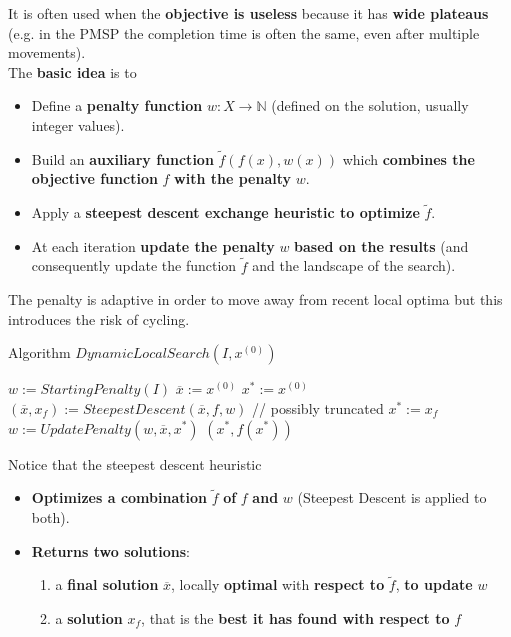 \documentclass[11pt]{article}
\begin{document}
	It is often used when the \textbf{objective is useless} because it has \textbf{wide plateaus} (e.g. in the PMSP the completion time is often the same, even after multiple movements).\\
	
	The \textbf{basic idea} is to
	\begin{itemize}
		\item Define a \textbf{penalty function} $w : X \rightarrow \mathbb{N}$ (defined on the solution, usually integer values).\\
		
		\item Build an \textbf{auxiliary function} $\tilde{f} (f (x) , w (x))$ which \textbf{combines the objective function} $f$ \textbf{with the penalty} $w$.\\
		
		\item Apply a \textbf{steepest descent exchange heuristic to optimize} $\tilde{f}$.\\
		
		\item At each iteration \textbf{update the penalty} $w$ \textbf{based on the results} (and consequently update the function $\tilde{f}$ and the landscape of the search).\\
	\end{itemize}
	
	The penalty is adaptive in order to move away from recent local optima but this introduces the risk of cycling.\\
	
	\newpage
	
	\begin{algorithm}
		\caption{Algorithm $DynamicLocalSearch(I , x^{(0)})$}
		\begin{algorithmic}
			\STATE $w := StartingPenalty(I )$
			\STATE $\overline{x} := x^{(0)}$
			\STATE $x^\ast := x^{(0)}$
				\STATE $(\overline{x}, x_f) := SteepestDescent(\overline{x}, f , w )$ // possibly truncated
					\STATE $x^\ast := x_f$
				\ENDIF
				\STATE $w := UpdatePenalty(w, \overline{x}, x^\ast)$
			\ENDWHILE
			\RETURN $(x^\ast, f (x^\ast))$
		\end{algorithmic}
	\end{algorithm}
	Notice that the steepest descent heuristic
	\begin{itemize}
		\item \textbf{Optimizes a combination} $\tilde{f}$ \textbf{of} $f$ \textbf{and} $w$ (Steepest Descent is applied to both).\\
		
		\item \textbf{Returns two solutions}:
		\begin{enumerate}
			\item a \textbf{final solution} $\overline{x}$, locally \textbf{optimal} with \textbf{respect to} $\tilde{f}$, \textbf{to update} $w$
			\item a \textbf{solution} $x_f$, that is the \textbf{best it has found with respect to} $f$
		\end{enumerate}
	\end{itemize}
	
\end{document}
